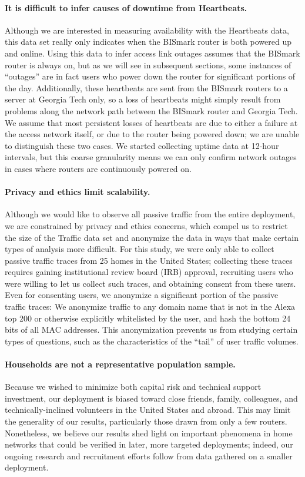 \paragraph{It is difficult to infer causes of downtime from Heartbeats.} Although we
are interested in measuring availability with the Heartbeats data, this data set
really only indicates when the BISmark router is both powered up and online.
Using this data to infer access link outages assumes that the BISmark router is
always on, but as we will see in subsequent sections, some instances of
``outages'' are in fact users who power down the router for significant portions
of the day. Additionally, these heartbeats are sent from the BISmark routers to
a server at Georgia Tech only, so a loss of heartbeats might simply result from
problems along the network path between the BISmark router and Georgia Tech.  We
assume that most persistent losses of heartbeats are due to either a failure at
the access network itself, or due to the router being powered down; we are
unable to distinguish these two cases. We started collecting uptime data
at 12-hour intervals, but this coarse granularity means we can only confirm network outages in
cases where routers are continuously powered on.

\paragraph{Privacy and ethics limit scalability.} Although we would like to observe all
passive traffic from the entire deployment, we are constrained by privacy and
ethics concerns, which compel us to restrict the size of the Traffic
data set and anonymize the data in ways that make certain types of analysis more
difficult.  For this study, we were only able to collect passive traffic traces
from 25 homes in the United States; collecting these traces requires gaining
institutional review board (IRB) approval, recruiting
users who were willing to let us collect such traces, and obtaining consent from
these users.  Even for consenting users, we anonymize a significant portion of
the passive traffic traces: We anonymize traffic to any domain name that is not
in the Alexa top 200 or otherwise explicitly whitelisted by the user, and hash
the bottom 24 bits of all MAC addresses.  This anonymization
prevents us from studying certain types of questions, such as the
characteristics of the ``tail'' of user traffic volumes.  

\paragraph{Households are not a representative population sample.} Because we
wished to minimize both capital risk and technical support investment, our
deployment is biased toward close friends, family, colleagues, and
technically-inclined volunteers in the United States and abroad. This may limit
the generality of our results, particularly those drawn from only a few routers.
Nonetheless, we believe our results shed light on important phenomena in home
networks that could be verified in later, more targeted deployments; indeed, our
ongoing research and recruitment efforts follow from data gathered on a
smaller \name{} deployment.

